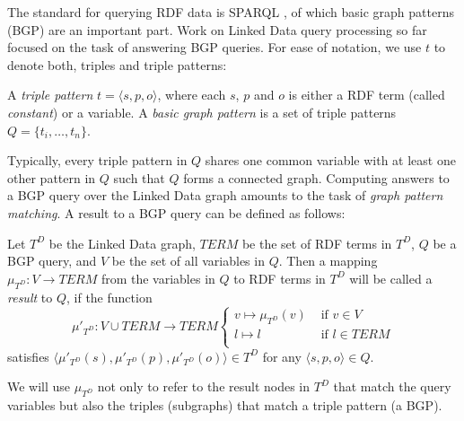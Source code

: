 The standard for querying RDF data is SPARQL
\cite{prudhommeaux_sparql_2008}, of which basic graph patterns (BGP)
are an important part. Work on Linked Data query processing so far
focused on the task of answering BGP queries. For ease of notation, we
use $t$ to denote both, triples and triple patterns:
\begin{definition}
  A \emph{triple pattern} $t=\langle s,p,o \rangle$, where each $s$,
  $p$ and $o$ is either a RDF term (called \emph{constant}) or a
  variable. A \emph{basic graph pattern} is a set of triple patterns
  $Q=\{t_i,\ldots,t_n\}$.
\end{definition}
Typically, every triple pattern in $Q$ shares one common variable with
at least one other pattern in $Q$ such that $Q$ forms a connected
graph. Computing answers to a BGP query over the Linked Data graph
amounts to the task of \emph{graph pattern matching}. A result to a
BGP query can be defined as follows:
\begin{definition}[Result]
  Let $T^D$ be the Linked Data graph, $TERM$ be the set of RDF terms
  in $T^D$, $Q$ be a BGP query, and $V$ be the set of all variables in
  $Q$. Then a mapping $\mu_{T^D}: V \to TERM$ from the variables in
  $Q$ to RDF terms in $T^D$ will be called a \emph{result} to $Q$, if
  the function
  \[
  \mu'_{T^D}: V \cup TERM \to TERM \left\{
    \begin{array}{ll}
      v \mapsto \mu_{T^D}(v) & \mbox{ if } v\in V \\
      l \mapsto l & \mbox{ if } l \in TERM\\
    \end{array}\right.
  \]
satisfies $\langle \mu'_{T^D}(s),\mu'_{T^D}(p), \mu'_{T^D}(o) \rangle
\in T^D$ for any $\langle s,p,o \rangle \in Q$.
\end{definition}
We will use $\mu_{T^D}$ not only to refer to
the result nodes in ${T^D}$ that match the query variables but also the
triples (subgraphs) that match a triple pattern (a BGP).

